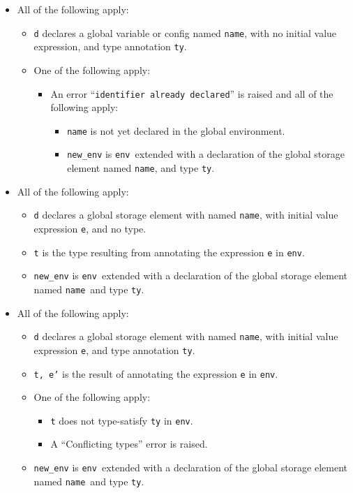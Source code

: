 \documentclass{book}
\newcommand\name[0]{\texttt{name}}
\newcommand\tenv[0]{\texttt{env}}
\begin{document}
\begin{itemize}
  \item All of the following apply:
  \begin{itemize}
    \item \texttt{d} declares a global variable or config named \name, with no initial value expression, and type annotation \texttt{ty}.
    \item One of the following apply:
    \begin{itemize}
      \item An error ``\texttt{identifier already declared}'' is raised and all of the following apply:
      \begin{itemize}
        \item \texttt{name} is not yet declared in the global environment.
        \item \texttt{new\_env} is \tenv\ extended with a declaration of the global storage element named \name, and type \texttt{ty}.
      \end{itemize}
    \end{itemize}
  \end{itemize}

  \item All of the following apply:
  \begin{itemize}
    \item \texttt{d} declares a global storage element with named \name, with initial value expression \texttt{e}, and no type.
    \item \texttt{t} is the type resulting from annotating the expression \texttt{e} in \tenv.
    \item \texttt{new\_env} is \tenv\ extended with a declaration of the global storage element named \name\ and type \texttt{ty}.
  \end{itemize}

  \item All of the following apply:
  \begin{itemize}
    \item \texttt{d} declares a global storage element with named \name, with initial value expression \texttt{e}, and type annotation \texttt{ty}.
    \item \texttt{t, e'} is the result of annotating the expression \texttt{e} in \tenv.
    \item One of the following apply:
    \begin{itemize}
      \item \texttt{t} does not type-satisfy \texttt{ty} in \tenv.
      \item A ``Conflicting types'' error is raised.
    \end{itemize}
    \item \texttt{new\_env} is \tenv\ extended with a declaration of the global storage element named \name\ and type \texttt{ty}.
  \end{itemize}
\end{itemize}
\end{document}
